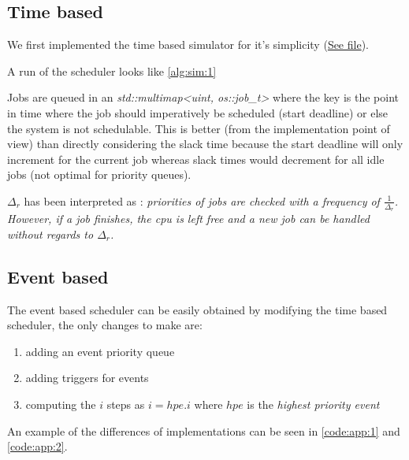 \documentclass[a4paper,12pt]{article}
\begin{document}

\subsection{Time based}

We first implemented the time based simulator for it's simplicity (\href{../h/os/llf_scheduler_time_based.h}{See file}).

A run of the scheduler looks like \ref{alg:sim:1}


Jobs are queued in an \emph{std::multimap<uint, os::job\_t>} where the key is the point in time where the job should imperatively be scheduled (start deadline) or else the system is not schedulable.
This is better (from the implementation point of view) than directly considering the slack time because the start deadline will only increment for the current job whereas slack times would decrement for all idle jobs (not optimal for priority queues).

$\Delta_r$ has been interpreted as : \emph{priorities of jobs are checked with a frequency of $\frac{1}{\Delta_r}$. However, if a job finishes, the cpu is left free and a new job can be handled without regards to $\Delta_r$.}
\subsection{Event based}

The event based scheduler can be easily obtained by modifying the time based scheduler, the only changes to make are:
\begin{enumerate}
	\item adding an event priority queue
	\item adding triggers for events
	\item computing the $i$ steps as $i = hpe.i$ where $hpe$ is the \emph{highest priority event}
\end{enumerate}

An example of the differences of implementations can be seen in \ref{code:app:1} and \ref{code:app:2}.
\end{document}
